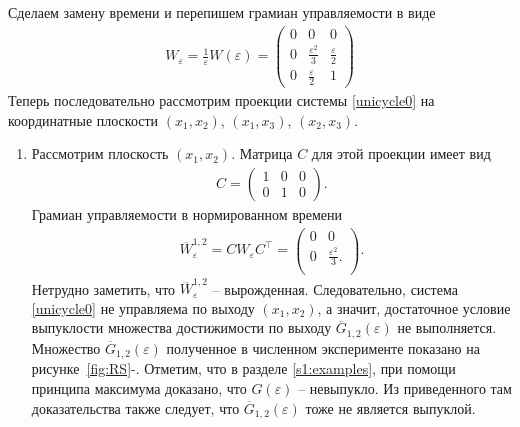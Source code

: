 \documentclass[../main.tex]{subfiles}
\begin{document}
    Сделаем замену времени и перепишем грамиан управляемости в виде
    \begin{gather*}
        W_{\varepsilon} = \frac{1}{\varepsilon}W(\varepsilon)     =\begin{pmatrix}
            0 & 0 & 0 \\
            0 & \frac{\varepsilon^2}{3} & \frac{\varepsilon}{2} \\
            0 &  \frac{\varepsilon}{2} & 1
        \end{pmatrix} 
    \end{gather*} 
    Теперь последовательно рассмотрим проекции системы \eqref{unicycle0} на координатные плоскости $ (x_1, x_2) $, $ (x_1, x_3) $, $ (x_2, x_3) $. \\
    
    \begin{enumerate}
        \item Рассмотрим плоскость $ (x_1, x_2) $. 
Матрица $ C $ для этой проекции имеет вид
        \begin{gather*}
            C = \begin{pmatrix}
                1 & 0 & 0 \\
                0 & 1 & 0
            \end{pmatrix}.
        \end{gather*}
        Грамиан управляемости в нормированном времени
        \begin{gather*}
            \overline{W}_{\varepsilon}^{1,2} =  C W_{\varepsilon} C^{\top}  =\begin{pmatrix}
                0 & 0 \\
                0 & \frac{\varepsilon^2}{3}. \\
            \end{pmatrix}.
        \end{gather*}
        Нетрудно заметить, что $ \overline{W}_{\varepsilon}^{1,2} $ -- вырожденная. 
Следовательно, система \eqref{unicycle0} не управляема по выходу $ (x_1, x_2) $, а значит, достаточное условие выпуклости множества достижимости по выходу $ \overline{G}_{1,2}(\varepsilon) $ не выполняется. 
Множество $ \overline{G}_{1,2}(\varepsilon) $ полученное в численном эксперименте показано на рисунке~\ref{fig:RS}-. 
Отметим, что в разделе \ref{s1:examples}, при помощи принципа максимума доказано, что $ G(\varepsilon) $ -- невыпукло. 
Из приведенного там доказательства также следует, что $ \overline{G}_{1,2}(\varepsilon) $ тоже не является выпуклой.
        

\end{enumerate}
\end{document}
